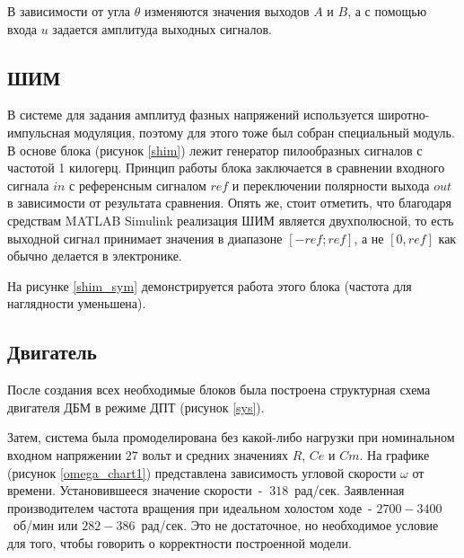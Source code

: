 
В зависимости от угла $\theta$ изменяются значения выходов $A$ и $B$, а с помощью входа $u$ задается амплитуда
выходных сигналов.


\subsection{ШИМ}

В системе для задания амплитуд фазных напряжений используется широтно-импульсная модуляция, 
поэтому для этого тоже был собран специальный модуль.
В основе блока (рисунок \ref{shim}) лежит генератор пилообразных сигналов с частотой 1 килогерц. 
Принцип работы блока заключается в сравнении входного сигнала $in$ с референсным сигналом
$ref$ и переключении полярности выхода $out$ в зависимости от результата сравнения. Опять же, стоит отметить, что
благодаря средствам MATLAB Simulink реализация ШИМ является двухполюсной, то есть выходной сигнал принимает
значения в диапазоне $[-ref; ref]$, а не $[0, ref]$ как обычно делается в электронике.

На рисунке \ref{shim_sym} демонстрируется работа этого блока (частота для наглядности уменьшена).


\subsection{Двигатель}

После создания всех необходимые блоков была построена структурная схема двигателя ДБМ в режиме ДПТ (рисунок \ref{sys}).


Затем, система была промоделирована без какой-либо нагрузки при номинальном входном 
напряжении $27$ вольт и средних значениях $R$, $Ce$ и $Cm$. На графике (рисунок \ref{omega_chart1}) 
представлена зависимость угловой скорости $\omega$ от времени. Установившееся значение скорости~- $~318$~рад/сек. Заявленная
производителем частота вращения при идеальном холостом ходе~- $2700-3400$~об/мин или $282-386$~рад/сек. Это 
не достаточное, но необходимое условие для того, чтобы говорить о корректности построенной модели.

